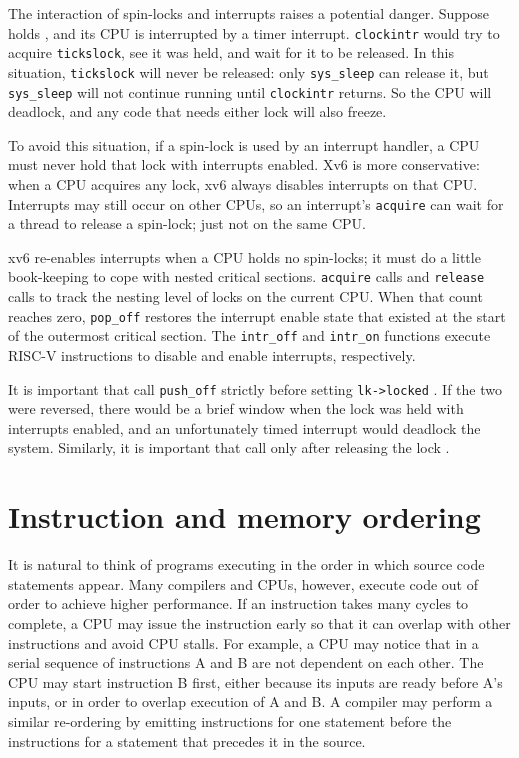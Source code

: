 The interaction of spin-locks and interrupts raises a potential danger.
Suppose
holds
,
and its CPU is interrupted by a timer interrupt.
\lstinline{clockintr}
would try to acquire
\lstinline{tickslock},
see it was held, and wait for it to be released.
In this situation,
\lstinline{tickslock}
will never be released: only
\lstinline{sys_sleep}
can release it, but
\lstinline{sys_sleep}
will not continue running until
\lstinline{clockintr}
returns.
So the CPU will deadlock, and any code
that needs either lock will also freeze.

To avoid this situation, if a spin-lock is used by an interrupt handler,
a CPU must never hold that lock with interrupts enabled.
Xv6 is more conservative: when a CPU acquires any
lock, xv6 always disables interrupts on that CPU.
Interrupts may still occur on other CPUs, so 
an interrupt's
\lstinline{acquire}
can wait for a thread to release a spin-lock; just not on the same CPU.

xv6 re-enables interrupts when a CPU holds no spin-locks; it must
do a little book-keeping to cope with nested critical sections.
\lstinline{acquire}
calls
and
\lstinline{release}
calls
to track the nesting level of locks on the current CPU.
When that count reaches zero,
\lstinline{pop_off} 
restores the interrupt enable state that existed 
at the start of the outermost critical section.
The
\lstinline{intr_off}
and
\lstinline{intr_on}
functions execute RISC-V instructions to disable and enable
interrupts, respectively.

It is important that
call
\lstinline{push_off}
strictly before setting
\lstinline{lk->locked}
.
If the two were reversed, there would be
a brief window when the lock
was held with interrupts enabled, and
an unfortunately timed interrupt would deadlock the system.
Similarly, it is important that
call
only after 
releasing the lock
.
\section{Instruction and memory ordering}

It is natural to think of programs executing in the order
in which source code statements appear.
Many
compilers and CPUs, however, execute code out of order
to achieve
higher performance.  If an instruction takes many cycles to complete,
a CPU may issue the instruction early so that it can
overlap with other instructions and avoid CPU stalls. For
example, a CPU may notice that in a serial sequence of
instructions A and B are not dependent on each other.
The CPU may start instruction B first, either because its
inputs are ready before A's inputs, or in order to overlap
execution of A and B.
A compiler may perform a similar re-ordering by emitting instructions
for one statement before the instructions for a statement that precedes it
in the source.

